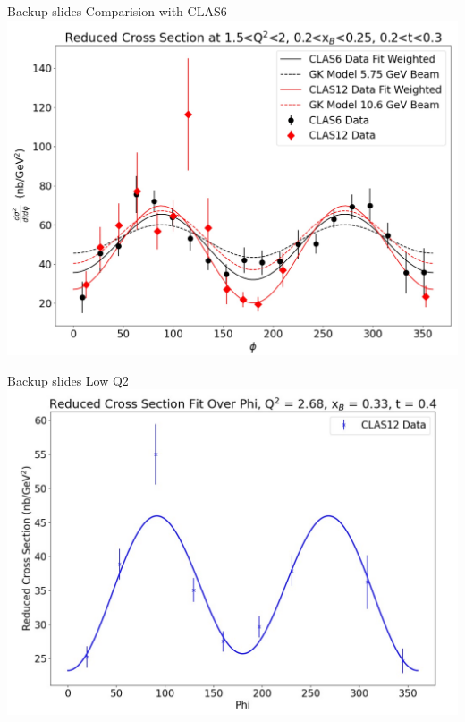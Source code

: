 \documentclass[aspectratio=169]{beamer}
\begin{document}
\begin{frame}{Backup slides}
\centering
Comparision with CLAS6\\

    \includegraphics[scale=0.2832]{DNP/comp_c12_gk_c6.jpg}\\
\end{frame}

\begin{frame}{Backup slides}
\centering
Low Q2\\

    \includegraphics[scale=0.2832]{DNP/beauty_2.jpg}\\
\end{frame}
\end{document}
